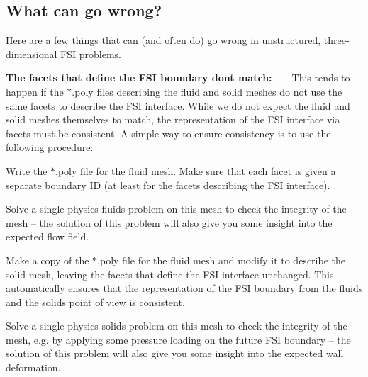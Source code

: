 \hypertarget{index_go_wrong}{}\subsection{What can go wrong?}\label{index_go_wrong}
Here are a few things that can (and often do) go wrong in unstructured, three-\/dimensional F\+SI problems.
\begin{DoxyItemize}
\item {\bfseries The facets that define the F\+SI boundary don\textquotesingle{}t match\+:} ~\newline
~\newline
 This tends to happen if the {\ttfamily $\ast$.poly} files describing the fluid and solid meshes do not use the same facets to describe the F\+SI interface. While we do not expect the fluid and solid meshes themselves to match, the representation of the F\+SI interface via facets {\ttfamily must} be consistent. A simple way to ensure consistency is to use the following procedure\+: ~\newline
~\newline

\begin{DoxyEnumerate}
\item Write the {\ttfamily $\ast$.poly} file for the fluid mesh. Make sure that each facet is given a separate boundary ID (at least for the facets describing the F\+SI interface). ~\newline
~\newline

\item Solve a single-\/physics fluids problem on this mesh to check the integrity of the mesh -- the solution of this problem will also give you some insight into the expected flow field. ~\newline
~\newline

\item Make a copy of the {\ttfamily $\ast$.poly} file for the fluid mesh and modify it to describe the solid mesh, leaving the facets that define the F\+SI interface unchanged. This automatically ensures that the representation of the F\+SI boundary from the fluid\textquotesingle{}s and the solid\textquotesingle{}s point of view is consistent. ~\newline
~\newline

\item Solve a single-\/physics solids problem on this mesh to check the integrity of the mesh, e.\+g. by applying some pressure loading on the future F\+SI boundary -- the solution of this problem will also give you some insight into the expected wall deformation. ~\newline
~\newline


\end{DoxyEnumerate}
\end{DoxyItemize}
